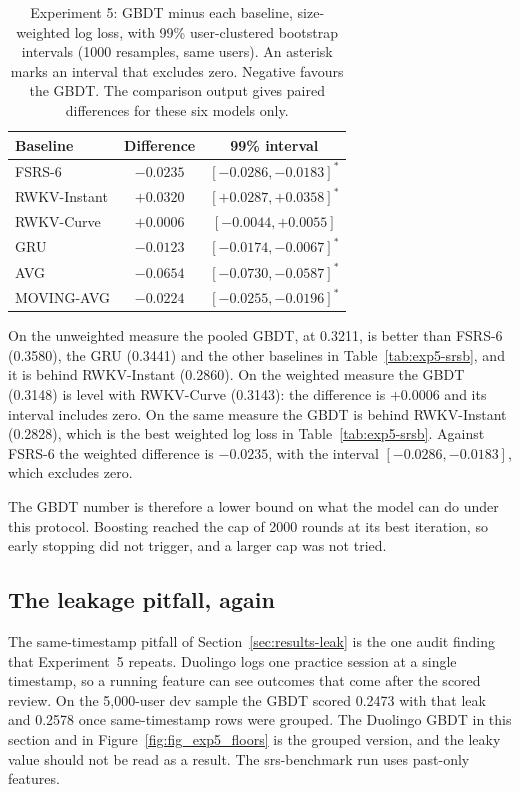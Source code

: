 \begin{table}[htbp]
  \centering
  \caption[Experiment 5: paired differences on srs-benchmark]{Experiment 5: GBDT minus each baseline, size-weighted log loss, with 99\% user-clustered
    bootstrap intervals (1000 resamples, same users). An asterisk marks an interval that excludes zero. Negative favours the GBDT. The comparison output
    gives paired differences for these six models only.}
  \label{tab:exp5-srsb-paired}
  \begin{tabular}{@{}lcc@{}}
    \toprule
    Baseline & Difference & 99\% interval \\
    \midrule
    FSRS-6 & $-0.0235$ & $[-0.0286, -0.0183]^{*}$ \\
    RWKV-Instant & $+0.0320$ & $[+0.0287, +0.0358]^{*}$ \\
    RWKV-Curve & $+0.0006$ & $[-0.0044, +0.0055]$ \\
    GRU & $-0.0123$ & $[-0.0174, -0.0067]^{*}$ \\
    AVG & $-0.0654$ & $[-0.0730, -0.0587]^{*}$ \\
    MOVING-AVG & $-0.0224$ & $[-0.0255, -0.0196]^{*}$ \\
    \bottomrule
  \end{tabular}
\end{table}

On the unweighted measure the pooled GBDT, at 0.3211, is better than FSRS-6 (0.3580), the GRU (0.3441) and the other
baselines in Table~\ref{tab:exp5-srsb}, and it is behind RWKV-Instant (0.2860). On the weighted measure the GBDT (0.3148)
is level with RWKV-Curve (0.3143): the difference is $+0.0006$ and its interval includes zero. On the same measure the GBDT is behind RWKV-Instant (0.2828), which is the best weighted log loss in Table~\ref{tab:exp5-srsb}. Against FSRS-6 the weighted
difference is $-0.0235$, with the interval $[-0.0286, -0.0183]$, which excludes zero.

The GBDT number is therefore a lower bound on what the model can do under this protocol. Boosting reached the cap of 2000
rounds at its best iteration, so early stopping did not trigger, and a larger cap was not tried.

\subsection{The leakage pitfall, again}
\label{sec:results-exp5-leak}

The same-timestamp pitfall of Section~\ref{sec:results-leak} is the one audit finding that Experiment~5 repeats. Duolingo logs one practice
session at a single timestamp, so a running feature can see outcomes that come after the scored review. On the 5,000-user dev sample the
GBDT scored 0.2473 with that leak and 0.2578 once same-timestamp rows were grouped. The Duolingo GBDT in this section and in
Figure~\ref{fig:fig_exp5_floors} is the grouped version, and the leaky value should not be read as a result. The srs-benchmark run
uses past-only features.

